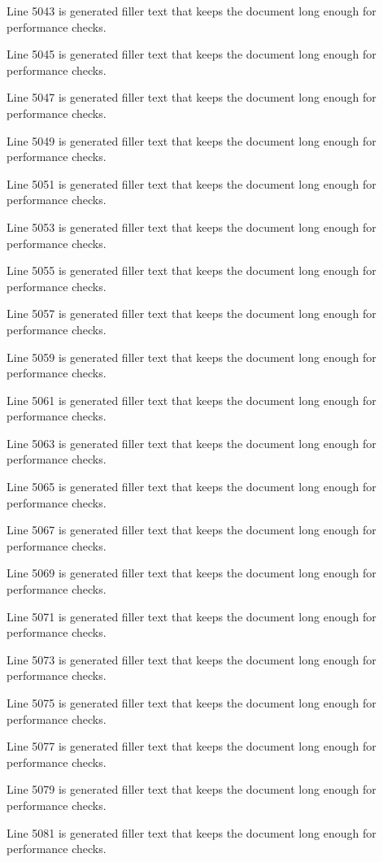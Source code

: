 Line 5043 is generated filler text that keeps the document long enough for performance checks.

Line 5045 is generated filler text that keeps the document long enough for performance checks.

Line 5047 is generated filler text that keeps the document long enough for performance checks.

Line 5049 is generated filler text that keeps the document long enough for performance checks.

Line 5051 is generated filler text that keeps the document long enough for performance checks.

Line 5053 is generated filler text that keeps the document long enough for performance checks.

Line 5055 is generated filler text that keeps the document long enough for performance checks.

Line 5057 is generated filler text that keeps the document long enough for performance checks.

Line 5059 is generated filler text that keeps the document long enough for performance checks.

Line 5061 is generated filler text that keeps the document long enough for performance checks.

Line 5063 is generated filler text that keeps the document long enough for performance checks.

Line 5065 is generated filler text that keeps the document long enough for performance checks.

Line 5067 is generated filler text that keeps the document long enough for performance checks.

Line 5069 is generated filler text that keeps the document long enough for performance checks.

Line 5071 is generated filler text that keeps the document long enough for performance checks.

Line 5073 is generated filler text that keeps the document long enough for performance checks.

Line 5075 is generated filler text that keeps the document long enough for performance checks.

Line 5077 is generated filler text that keeps the document long enough for performance checks.

Line 5079 is generated filler text that keeps the document long enough for performance checks.

Line 5081 is generated filler text that keeps the document long enough for performance checks.

